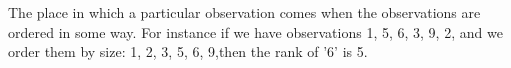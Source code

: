 The place in which a particular observation comes when the observations
are ordered in some way. For instance if we have observations 1, 5, 6, 3, 9, 2,
and we order them by size: 1, 2, 3, 5, 6, 9,then the rank of '6' is 5.